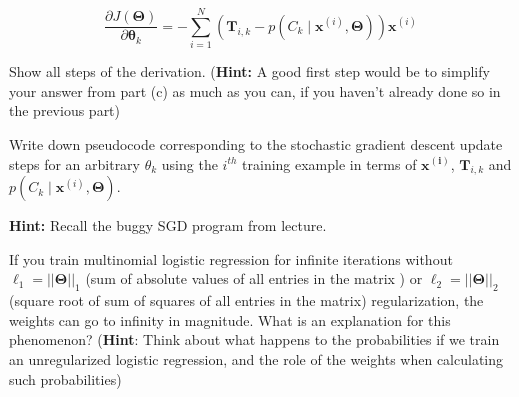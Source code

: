 \documentclass[11pt]{exam}
\numberwithin{equation}{section} %
\numberwithin{figure}{section} %
\numberwithin{table}{section} %
\newcommand{\xv}{\mathbf{x}}
\newcommand{\Tv}{\mathbf{T}}
\newcommand{\thetav     }{\boldsymbol \theta     }
\newcommand{\Thetav     }{\boldsymbol \Theta     }
\begin{document}
\begin{questions}
    $$
    \frac{\partial J(\Thetav)}{\partial \thetav_k} = - \sum_{i = 1}^N \left(\Tv_{i, k} - p\left(C_k \mid \xv^{(i)}, \Thetav\right)\right)  \xv^{(i)}
    $$
    
    Show all steps of the derivation. (\textbf{Hint:} A good first step would be to simplify your answer from part (c) as much as you can, if you haven't already done so in the previous part)
    
    
     \begin{your_solution}
    \bigskip \bigskip \bigskip \bigskip \bigskip \bigskip \bigskip \bigskip
    \bigskip \bigskip \bigskip \bigskip \bigskip \bigskip \bigskip \bigskip
  
    \end{your_solution}
    
    \clearpage
    
    \question [2] Write down pseudocode corresponding to the stochastic gradient descent update steps for an arbitrary $\theta_k$ using the $i^{th}$ training example in terms of $\mathbf{x^{(i)}}$, $\Tv_{i, k}$ and $p\left(C_k \mid \xv^{(i)}, \Thetav\right)$. 
    
    \textbf{Hint:} Recall the buggy SGD program from lecture.
    
    \begin{your_solution}
    \bigskip \bigskip \bigskip \bigskip \bigskip \bigskip \bigskip \bigskip
  
    \end{your_solution}
    
    
  
    \question [1] If you train multinomial logistic regression for infinite iterations without $\ell_1 = ||\Thetav||_1$ (sum of absolute values of all entries in the matrix ) or $\ell_2=||\Thetav||_2$ (square root of sum of squares of all entries in the matrix) regularization, the weights can go to infinity in magnitude. What is an explanation for this phenomenon? (\textbf{Hint}: Think about what happens to the probabilities if we train an unregularized logistic regression, and the role of the weights when calculating such probabilities)

    
    \begin{your_solution}
    \bigskip \bigskip \bigskip \bigskip \bigskip \bigskip \bigskip \bigskip


\end{your_solution}
\end{questions}
\end{document}
